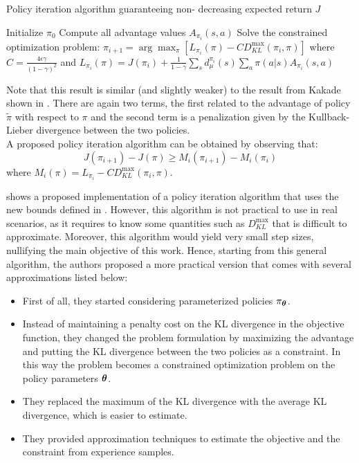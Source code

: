 \begin{algorithm}[!t]
\caption{Policy iteration algorithm guaranteeing non-
decreasing expected return $J$}
\label{alg:trpo-iteration}
\begin{algorithmic}
\State Initialize $\pi_0$
\State Compute all advantage values $A_{\pi_i}(s,a)$
\State Solve the constrained optimization problem:
\State $\pi_{i+1} = \arg\max_\pi \left[ L_{\pi_i}(\pi)-CD_{KL}^{\max}(\pi_i, \pi) \right]$
\State \qquad where $C = \frac{4\epsilon\gamma}{(1-\gamma)^2}$
\State \qquad and $L_{\pi_i}(\pi)=J(\pi_i) + \frac{1}{1-\gamma}\sum_s d_\mu^{\pi_i}(s)\sum_a\pi(a|s)A_{\pi_i}(s,a)$
\EndFor
\end{algorithmic}
\end{algorithm}

Note that this result is similar (and slightly weaker) to the result from Kakade shown in . There are again two terms, the first related to the advantage of policy $\tilde{\pi}$ with respect to $\pi$ and the second term is a penalization given by the Kullback-Lieber divergence between the two policies.\\
A proposed policy iteration algorithm can be obtained by observing that:
\[
J(\pi_{i+1}) - J(\pi) \geq M_i(\pi_{i+1}) - M_i(\pi_i)
\]
where $M_i(\pi) = L_{\pi_i} - CD_{KL}^{\max}(\pi_i, \pi)$.

 shows a proposed implementation of a policy iteration algorithm that uses the new bounds defined in . However, this algorithm is not practical to use in real scenarios, as it requires to know some quantities such as $D_{KL}^{\max}$ that is difficult to approximate. Moreover, this algorithm would yield very small step sizes, nullifying the main objective of this work. Hence, starting from this general algorithm, the authors proposed a more practical version that comes with several approximations listed below:
\begin{itemize}
\item First of all, they started considering parameterized policies $\pi_{{\boldsymbol{\theta}}}$.
\item Instead of maintaining a penalty cost on the KL divergence in the objective function, they changed the problem formulation by maximizing the advantage and putting the KL divergence between the two policies as a constraint. In this way the problem becomes a constrained optimization problem on the policy parameters ${\boldsymbol{\theta}}$.
\item They replaced the maximum of the KL divergence with the average KL divergence, which is easier to estimate.
\item They provided approximation techniques to estimate the objective and the constraint from experience samples.
\end{itemize}

